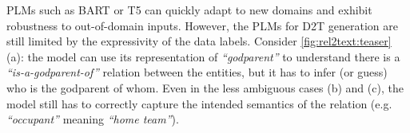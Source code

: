 PLMs such as BART \cite{lewisBARTDenoisingSequencetoSequence2019} or T5 \cite{raffelExploringLimitsTransfer2019} can quickly adapt to new domains and exhibit robustness to out-of-domain inputs. However, the PLMs for D2T generation are still limited by the expressivity of the data labels. Consider \autoref{fig:rel2text:teaser} (a): the model can use its representation of \textit{``godparent''} to understand there is a \textit{``is-a-godparent-of''} relation between the entities, but it has to infer (or guess) who is the godparent of whom. Even in the less ambiguous cases (b) and (c), the model still has to correctly capture the intended semantics of the relation (e.g. \textit{``occupant''} meaning \textit{``home team''}).


\begin{figure}[t]


\end{figure}

